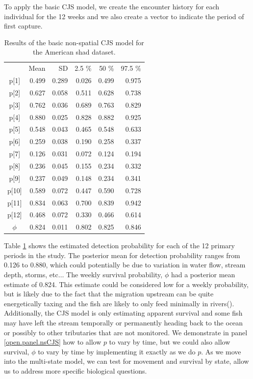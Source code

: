 To apply the basic CJS model, we create the
encounter history for each individual for the 12 weeks and we also create
a vector to indicate the period of first capture.

\begin{table}
\centering
\caption{Results of the basic non-spatial CJS model for the American shad dataset.
}
\begin{tabular}{crrrrr}
\hline \hline
&    Mean   &  SD  &  2.5 \%   &   50 \%    &  97.5 \% \\
p[1] & 0.499 & 0.289 & 0.026 & 0.499 & 0.975 \\
p[2] & 0.627 & 0.058 & 0.511 & 0.628 & 0.738 \\
p[3] & 0.762 & 0.036 & 0.689 & 0.763 & 0.829 \\
p[4] & 0.880 & 0.025 & 0.828 & 0.882 & 0.925 \\
p[5] & 0.548 & 0.043 & 0.465 & 0.548 & 0.633 \\
p[6] & 0.259 & 0.038 & 0.190 & 0.258 & 0.337 \\
p[7] & 0.126 & 0.031 & 0.072 & 0.124 & 0.194 \\
p[8] & 0.236 & 0.045 & 0.155 & 0.234 & 0.332 \\
p[9] & 0.237 & 0.049 & 0.148 & 0.234 & 0.341 \\
p[10]& 0.589 & 0.072 & 0.447 & 0.590 & 0.728  \\
p[11]& 0.834 & 0.063 & 0.700 & 0.839 & 0.942 \\
p[12]& 0.468 & 0.072 & 0.330 & 0.466 & 0.614 \\
$\phi$  & 0.824 & 0.011 & 0.802 & 0.825 & 0.846 \\
\hline
\end{tabular}
\label{open.tab.simple-shad}
\end{table}

Table \ref{open.tab.simple-shad} shows the estimated detection probability for each of the 12 primary periods
in the study.  The posterior mean for detection probability ranges from 0.126 to 0.880, which could potentially
be due to variation in water flow, stream depth, storms, etc$\dots$  The weekly survival probability, $\phi$ had a
posterior mean estimate of 0.824.  This estimate could be considered low for a weekly probability, but
is likely due to the fact
that the migration upstream can be quite energetically taxing and the fish are likely to only feed minimally
in rivers(\citep{leggett_carscadden:1978, leonard_mccormick:1999}).
Additionally, the CJS model is only estimating apparent survival
and some fish may have left the stream temporally or permanently heading back to the ocean
or possibly to other tributaries that are not monitored.
We demonstrate in panel \ref{open.panel.nsCJS}
how to allow $p$ to vary by time, but we could also allow survival, $\phi$ to vary by time by
implementing it exactly as
we do $p$.
As we move into the multi-state model, %
we can test for movement and survival by state, allow us to address more specific biological questions.



